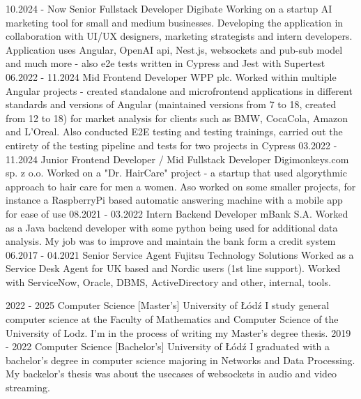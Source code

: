 \documentclass[9pt]{developercv}%
\begin{document}
\begin{entrylist}
	\entry
	{10.2024 - Now}
	{Senior Fullstack Developer}
	{Digibate}
	{Working on a startup AI marketing tool for small and medium businesses. Developing the application in collaboration with UI/UX designers, marketing strategists and intern developers. Application uses Angular, OpenAI api, Nest.js, websockets and pub-sub model and much more - also e2e tests written in Cypress and Jest with Supertest}
	\entry
	{06.2022 - 11.2024}
	{Mid Frontend Developer}
	{WPP plc.}
	{Worked within multiple Angular projects - created standalone and microfrontend applications in different standards and versions of Angular (maintained versions from 7 to 18, created from 12 to 18) for market analysis for clients such as BMW, CocaCola, Amazon and L'Oreal. Also conducted E2E testing and testing trainings, carried out the entirety of the testing pipeline and tests for two projects in Cypress}
	\entry
	{03.2022 - 11.2024}
	{Junior Frontend Developer / Mid Fullstack Developer}
	{Digimonkeys.com sp. z o.o.}
	{Worked on a "Dr. HairCare" project - a startup that used algorythmic approach to hair care for men a women. Aso worked on some smaller projects, for instance a RaspberryPi based automatic answering machine with a mobile app for ease of use}
	\entry
	{08.2021 - 03.2022}
	{Intern Backend Developer}
	{mBank S.A.}
	{Worked as a Java backend developer with some python being used for additional data analysis. My job was to improve and maintain the bank form a credit system}
	\entry
	{06.2017 - 04.2021}
	{Senior Service Agent}
	{Fujitsu Technology Solutions}
	{Worked as a Service Desk Agent for UK based and Nordic users (1st line support). Worked with ServiceNow, Oracle, DBMS, ActiveDirectory and other, internal, tools.}
\end{entrylist}



\begin{entrylist}
	\entry
	{2022 - 2025}
	{Computer Science [Master's]}
	{University of Łódź}
	{I study general computer science at the Faculty of Mathematics and Computer Science of the University of Lodz. I'm in the process of writing my Master's degree thesis.}
	\entry
	{2019 - 2022}
	{Computer Science [Bachelor's]}
	{University of Łódź}
	{I graduated with a bachelor's degree in computer science majoring in Networks and Data Processing. My backelor's thesis was about the usecases of websockets in audio and video streaming.}
\end{entrylist}
\end{document}
